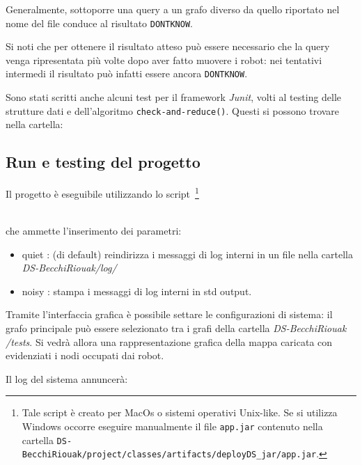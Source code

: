 Generalmente, sottoporre una query a un grafo diverso da quello riportato
nel nome del file conduce al risultato \texttt{DONTKNOW}.

Si noti che per ottenere il risultato atteso può essere necessario
che la query venga ripresentata più volte dopo aver fatto muovere i robot:
nei tentativi intermedi il risultato può infatti essere ancora \texttt{DONTKNOW}.

Sono stati scritti anche alcuni test per il framework \emph{Junit}, volti al
testing delle strutture dati e dell'algoritmo \texttt{check-and-reduce()}.
Questi si possono trovare nella cartella:\\

\subsection{Run e testing del progetto}
Il progetto è eseguibile utilizzando lo script~\footnote{
  Tale script è creato per MacOs o sistemi operativi Unix-like.
  Se si utilizza Windows occorre eseguire manualmente il
  file \texttt{app.jar} contenuto nella cartella
  \texttt{DS-BecchiRiouak/project/classes/artifacts/deployDS\_jar/app.jar}.}


\\
che ammette l'inserimento dei parametri:
\begin{itemize}
\item quiet : (di default) reindirizza i messaggi di log interni in un file nella
  cartella \emph{DS-BecchiRiouak/log/ }
\item noisy : stampa i messaggi di log interni in std output.
\end{itemize}

Tramite l'interfaccia grafica è possibile settare le configurazioni di sistema:
il grafo principale può essere selezionato tra i grafi della cartella
\emph{DS-BecchiRiouak /tests}.
Si vedrà allora una rappresentazione grafica della mappa caricata con
evidenziati i nodi occupati dai robot.

Il log del sistema annuncerà:



